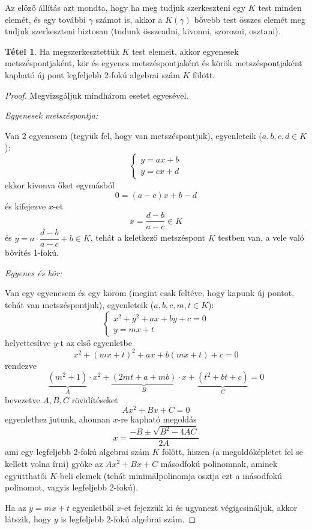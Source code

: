 \documentclass[12pt]{book}
\theoremstyle{plain} %
\theoremstyle{definition} %
\newtheorem{theo/}{Tétel}[section]
\newenvironment{theo}
  {\renewcommand{\qedsymbol}{$\clubsuit$}%
   \pushQED{\qed}\begin{theo/}}
  {\popQED\end{theo/}}
\theoremstyle{remark}
\renewcommand\qedsymbol{$\blacksquare$}
\numberwithin{equation}{section}  %
\begin{document}
	Az előző állítás azt mondta, hogy ha meg tudjuk szerkeszteni egy $K$ test minden elemét, és egy további $\gamma$ számot is, akkor a $K(\gamma)$ bővebb test összes elemét meg tudjuk szerkeszteni biztosan (tudunk összeadni, kivonni, szorozni, osztani).
	
	\begin{theo}
		Ha megszerkesztettük $K$ test elemeit, akkor egyenesek metszéspontjaként, kör és egyenes metszéspontjaként és körök metszéspontjaként kapható új pont legfeljebb 2-fokú algebrai szám $K$ fölött.
	\end{theo}

	\begin{proof}
		Megvizsgáljuk mindhárom esetet egyesével.
		
		\textit{Egyenesek metszéspontja:}
		
		Van 2 egyenesem (tegyük fel, hogy van metszéspontjuk), egyenleteik ($a,b,c,d\in K$):
		\[
		\begin{cases*}
		y = ax+b \\
		y = cx+d 
		\end{cases*}
		\]
		ekkor kivonva őket egymásból
		\[ 0 = (a-c)x+b-d  \]
		és kifejezve $x$-et
		\[ x = \dfrac{d-b}{a-c} \in K   \]
		és $y = a\cdot \dfrac{d-b}{a-c} +b \in K $, tehát a keletkező metszéspont $K$ testben van, a vele való bővítés 1-fokú.
		
		\textit{Egyenes és kör:}
		
		Van egy egyenesem és egy köröm (megint csak feltéve, hogy kapunk új pontot, tehát van metszéspontjuk), egyenleteik ($a,b,c,m,t\in K$):
		\[
		\begin{cases*}
		x^2+y^2+ax+by+c = 0 \\
		y = mx+t
		\end{cases*}
		\]
		helyettesítve $y$-t az első egyenletbe
		\[ x^2+(mx+t)^2+ax+b(mx+t)+c=0  \]
		rendezve
		\[ \underbrace{(m^2+1)}_{A}\cdot x^2 + \underbrace{(2mt+a+mb)}_{B}\cdot x + \underbrace{(t^2+ bt +c)}_{C} =0  \]
		bevezetve $A,B,C$ rövidítéseket
		\[ Ax^2+Bx+C = 0 \]
		egyenlethez jutunk, ahonnan $x$-re kapható megoldás
		\[ x = \dfrac{-B\pm \sqrt{B^2-4AC}}{2A}  \]
		ami egy legfeljebb 2-fokú algebrai szám $K$ fölött, hiszen (a megoldóképletet fel se kellett volna írni) gyöke az $Ax^2+Bx+C$ másodfokú polinomnak, aminek együtthatói $K$-beli elemek (tehát minimálpolinomja osztja ezt a másodfokú polinomot, vagyis legfeljebb 2-fokú). 
		
		Ha az $y=mx+t$ egyenletből $x$-et fejezzük ki és ugyanezt végigcsináljuk, akkor látszik, hogy $y$ is legfeljebb 2-fokú algebrai szám.
		

\end{proof}
\end{document}
